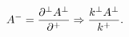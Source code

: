 \begin{equation*}
A^{-}=\frac{\partial ^{\perp }A^{\perp }}{\partial ^{+}}\Rightarrow \frac{%
k^{\perp }A^{\perp }}{k^{+}}.
\end{equation*}

